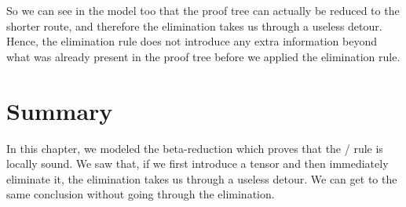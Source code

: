 \documentclass[../../../main.tex]{subfiles}
\begin{document}
So we can see in the model too that the proof tree can actually be reduced to the shorter route, and therefore the elimination takes us through a useless detour. Hence, the elimination rule does not introduce any extra information beyond what was already present in the proof tree before we applied the elimination rule.


\section{Summary}

In this chapter, we modeled the beta-reduction which proves that the \tensorElim/ rule is locally sound. We saw that, if we first introduce a tensor and then immediately eliminate it, the elimination takes us through a useless detour. We can get to the same conclusion without going through the elimination.
\end{document}
